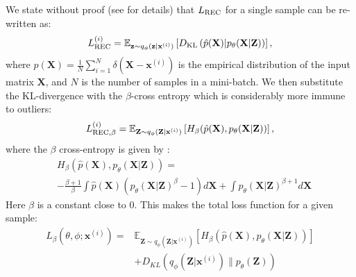 We state without proof (see \citet{akrami2019robustvae, akrami2020robustvaetabular} for details) that $L_{\rm {REC}}$ for a single sample can be re-written as:
\begin{align}
L_{\rm {REC}}^{(i)} = \mathbb{E}_{\mathbf{z} \sim q_{\phi}(\mathbf{z} | \mathbf{x}^{(i)})}\left[D_{\rm {KL}} \left(\hat{p}(\mathbf{X}) | p_\theta(\mathbf{X}|\mathbf{Z})\right)\right], \label{eq:lrec_mod}
\end{align}
where $\hat{p}(\mathbf{X}) = \frac{1}{N} \sum_{i=1}^{N} \delta (\mathbf{X}- \mathbf{x}^{(i)})$ is the empirical distribution of the input matrix $\mathbf{X}$, and $N$ is the number of samples in a mini-batch. We then substitute the KL-divergence with the $\beta$-cross entropy \citep{ghosh2016robust_variationalbayesianinference} which is considerably more immune to outliers:
\begin{align}
    L_{\rm{REC}, \beta}^{(i)} = \mathbb{E}_{\mathbf{Z} \sim q_{\phi}(\mathbf{Z} | \mathbf{x}^{(i)})}\left[H_{\beta}(\hat{p}(\mathbf{X}),p_{\theta}(\mathbf{X} | \mathbf{Z}))\right], \label{eq:lrec_beta}
\end{align}
where the $\beta$ cross-entropy is given by \cite{formula_betacrossentropy,adaptiveoptics0,rvae_orig}:
\begin{align}
    &H_{\beta}(\hat{p}(\mathbf{X}),p_{\theta}(\mathbf{X} | \mathbf{Z})) = \nonumber \\
    &-\frac{\beta+1}{\beta}\!\int\!\hat{p}(\mathbf{X})\left(p_{\theta}(\mathbf{X} | \mathbf{Z})^{\beta}-1\right) d \mathbf{X}+\int\!p_{\theta}(\mathbf{X} | \mathbf{Z})^{\beta+1} d \mathbf{X} \label{eq:ce_beta_def}
\end{align}
Here $\beta$ is a constant close to 0. This makes the total loss function for a given sample:
\begin{align}
L_{\beta}\left(\theta, \phi ; \mathbf{x}^{(i)}\right) =& \mathbb{E}_{\mathbf{Z} \sim q_{\phi}(\mathbf{Z} | \mathbf{x}^{(i)})}\left[H_{\beta}(\hat{p}(\mathbf{X}),p_{\theta}(\mathbf{X} | \mathbf{Z}))\right] \nonumber \\
&+ D_{K L}\left(q_{\phi}\left(\mathbf{Z} | \mathbf{x}^{(i)}\right) \| p_{\theta}(\mathbf{Z})\right) \label{eq:loss_beta_prelim}
\end{align}

